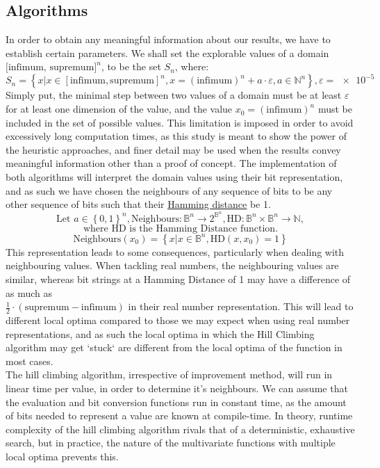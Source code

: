 \documentclass{article}
\begin{document}
\subsection{Algorithms}
In order to obtain any meaningful information about our results, we have to establish certain parameters. We shall set the explorable values of a domain $\text{[infimum, supremum]}^n$, to be the set $S_n$, where:
$$ S_n = \left\{ x | x \in [\text{infimum}, \text{supremum}]^n, x = (\text{infimum})^n + a \cdot \varepsilon, a \in \mathbb{N}^n \right\}, \varepsilon = \num{e-5} $$
Simply put, the minimal step between two values of a domain must be at least $\varepsilon$ for at least one dimension of the value, and the value $ x_0 = (\text{infimum})^n $ must be included in the set of possible values. This limitation is imposed in order to avoid excessively long computation times, as this study is meant to show the power of the heuristic approaches, and finer detail may be used when the results convey meaningful information other than a proof of concept.
The implementation of both algorithms will interpret the domain values using their bit representation, and as such we have chosen the neighbours of any sequence of bits to be any other sequence of bits such that their \underline{\href{https://en.wikipedia.org/wiki/Hamming_distance}{Hamming distance}}\cite{HD} be 1.
$$ \text{Let } a \in \left\{0, 1\right\}^n,
\text{Neighbours} \colon \mathbb{B}^n \to 2^{\mathbb{B}^n},
\text{HD}:\mathbb{B}^n \times \mathbb{B}^n \to \mathbb{N},$$ $$\text{where HD is the Hamming Distance function.}$$
$$ \text{Neighbours}\left(x_0\right) = \left\{x | x \in \mathbb{B}^n, \text{HD}\left(x, x_0\right) = 1  \right\} $$
This representation leads to some consequences, particularly when dealing with neighbouring values. When tackling real numbers, the neighbouring values are similar, whereas bit strings at a Hamming Distance of 1 may have a difference of as much as \\$ \frac{1}{2}\cdot\left(\text{supremum} - \text{infimum}\right)$ in their real number representation. This will lead to different local optima compared to those we may expect when using real number representations, and as such the local optima in which the Hill Climbing algorithm may get `stuck` are different from the local optima of the function in most cases. \\
The hill climbing algorithm, irrespective of improvement method, will run in linear time per value, in order to determine it's neighbours. We can assume that the evaluation and bit conversion functions run in constant time, as the amount of bits needed to represent a value are known at compile-time. In theory, runtime complexity of the hill climbing algorithm rivals that of a deterministic, exhaustive search, but in practice, the nature of the multivariate functions with multiple local optima prevents this. 
\end{document}
